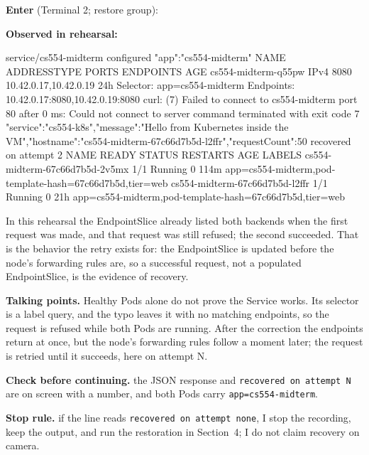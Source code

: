\documentclass[11pt,letterpaper]{article}
\newcommand{\code}[1]{\texttt{#1}}
\newcommand{\talk}[1]{\begin{shaded*}\noindent\textbf{Talking points.} #1\end{shaded*}}
\newcommand{\enter}[1]{\par\noindent\textbf{Enter} (#1):\par}
\newcommand{\observed}{\par\noindent\textbf{Observed in rehearsal:}\par}
\newcommand{\checkpoint}[1]{\par\noindent\textbf{Check before continuing.} #1\par}
\newcommand{\stoprule}[1]{\par\noindent\textbf{Stop rule.} #1\par}
\begin{document}
\enter{Terminal 2; restore group}
\observed
\begin{out}
service/cs554-midterm configured
{"app":"cs554-midterm"}
NAME                  ADDRESSTYPE   PORTS   ENDPOINTS               AGE
cs554-midterm-q55pw   IPv4          8080    10.42.0.17,10.42.0.19   24h
Selector:                 app=cs554-midterm
Endpoints:                10.42.0.17:8080,10.42.0.19:8080
curl: (7) Failed to connect to cs554-midterm port 80 after 0 ms: Could not connect to server
command terminated with exit code 7
{"service":"cs554-k8s","message":"Hello from Kubernetes inside the VM","hostname":"cs554-midterm-67c66d7b5d-l2ffr","requestCount":50}
recovered on attempt 2
NAME                             READY   STATUS    RESTARTS   AGE    LABELS
cs554-midterm-67c66d7b5d-2v5mx   1/1     Running   0          114m   app=cs554-midterm,pod-template-hash=67c66d7b5d,tier=web
cs554-midterm-67c66d7b5d-l2ffr   1/1     Running   0          21h    app=cs554-midterm,pod-template-hash=67c66d7b5d,tier=web
\end{out}
In this rehearsal the EndpointSlice already listed both backends when the first request was made, and that request was still refused; the second succeeded. That is the behavior the retry exists for: the EndpointSlice is updated before the node's forwarding rules are, so a successful request, not a populated EndpointSlice, is the evidence of recovery.
\talk{Healthy Pods alone do not prove the Service works. Its selector is a label query, and the typo leaves it with no matching endpoints, so the request is refused while both Pods are running. After the correction the endpoints return at once, but the node's forwarding rules follow a moment later; the request is retried until it succeeds, here on attempt N.}
\checkpoint{the JSON response and \code{recovered on attempt N} are on screen with a number, and both Pods carry \code{app=cs554-midterm}.}
\stoprule{if the line reads \code{recovered on attempt none}, I stop the recording, keep the output, and run the restoration in Section~4; I do not claim recovery on camera.}
\end{document}
